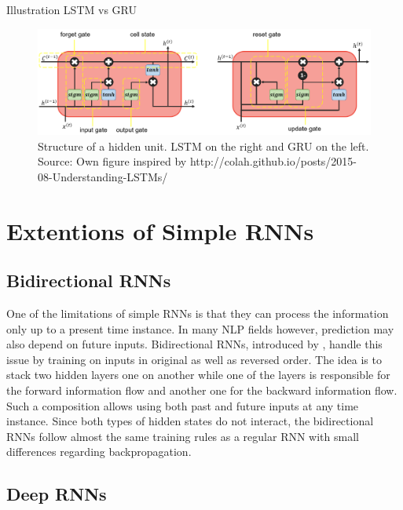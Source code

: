 \documentclass[]{krantz}
\begin{document}
Illustration LSTM vs GRU

\begin{figure}

{\centering \includegraphics[width=1\linewidth]{figures/01-02-rnns-and-their-applications-in-nlp/03_lstm_vs_gru} 

}

\caption{Structure of a hidden unit. LSTM on the right and GRU on the left. Source: Own figure inspired by http://colah.github.io/posts/2015-08-Understanding-LSTMs/}\label{fig:01-02-lstm-gru}
\end{figure}

\hypertarget{extentions-of-simple-rnns}{%
\section{Extentions of Simple RNNs}\label{extentions-of-simple-rnns}}

\hypertarget{bidirectional-rnns}{%
\subsection{Bidirectional RNNs}\label{bidirectional-rnns}}

One of the limitations of simple RNNs is that they can process the information only up to a present time instance. In many NLP fields however, prediction may also depend on future inputs. Bidirectional RNNs, introduced by \citet{schuster1997bidirectional}, handle this issue by training on inputs in original as well as reversed order. The idea is to stack two hidden layers one on another while one of the layers is responsible for the forward information flow and another one for the backward information flow. Such a composition allows using both past and future inputs at any time instance. Since both types of hidden states do not interact, the bidirectional RNNs follow almost the same training rules as a regular RNN with small differences regarding backpropagation.

\hypertarget{deep-rnns}{%
\subsection{Deep RNNs}\label{deep-rnns}}
\end{document}
